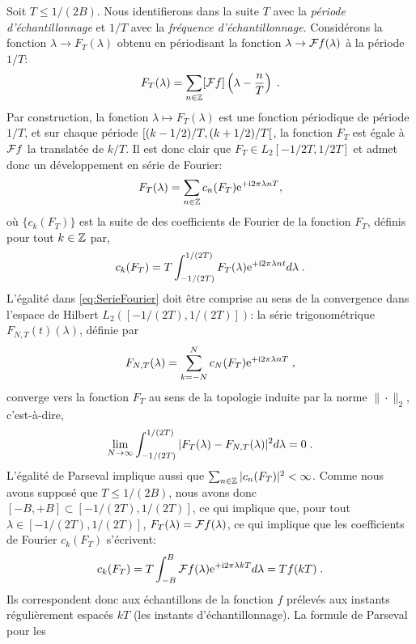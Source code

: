 Soit  $T \leq 1/(2B)$. Nous identifierons dans la suite $T$ avec la \emph{p{\'e}riode d'{\'e}chantillonnage} et $1/T$ avec la \emph{fr{\'e}quence d'{\'e}chantillonnage}.
Consid{\'e}rons la fonction $\lambda \to F_T(\lambda)$ obtenu en p{\'e}riodisant la fonction $\lambda \to \mathcal{F} f(\lambda)$ {\`a} la p{\'e}riode $1/T$:
$$
F_T (\lambda) = \sum_{n \in \mathbb{Z}} [\mathcal{F} f] \left( \lambda - \frac{n}{T} \right) \;.
$$
Par construction, la fonction $\lambda \mapsto F_T(\lambda)$ est une fonction p{\'e}riodique de p{\'e}riode $1/T$, et sur chaque
p{\'e}riode $\left[(k-1/2)/T,(k+1/2)/T\right[$, la fonction $F_T$ est {\'e}gale {\`a}  $\mathcal{F} f$ la translat{\'e}e de $k/T$.  Il est donc clair que
$F_T \in L_2{[-1/2T,1/2T]}$ et  admet donc un d{\'e}veloppement en s{\'e}rie de
Fourier:
\begin{equation}
\label{eq:SerieFourier}
F_T (\lambda) = \sum_{n \in \mathbb{Z}} c_n(F_T) \mathrm{e}^{+ \mathrm{i} 2 \pi \lambda n T},
\end{equation}
o{\`u} $\{c_k(F_T)\}$ est la suite de des coefficients de Fourier de la fonction $F_T$,
d{\'e}finis pour tout $k\in\mathbb{Z}$ par,
\begin{equation}
\label{eq:CoefficientFourier}
c_k(F_T) = T \int_{-1/(2T)}^{1/(2T)} F_T(\lambda) \mathrm{e}^{+ \mathrm{i} 2 \pi \lambda n t} d \lambda\;.
\end{equation}
L'{\'e}galit{\'e} dans \eqref{eq:SerieFourier} doit {\^e}tre comprise au sens de la convergence dans l'espace de Hilbert
$L_2([-1/(2T),1/(2T)])$: la s{\'e}rie trigonom{\'e}trique $F_{N,T}(t)(\lambda)$, d{\'e}finie par
\begin{equation}
F_{N,T}(\lambda)= \sum_{k=-N}^N c_N(F_T) \mathrm{e}^{+ \mathrm{i} 2 \pi \lambda n T} \;,
\end{equation}
converge vers la fonction $F_T$ au sens de la topologie induite par la norme $\|\cdot\|_2$, c'est-{\`a}-dire,
$$
\lim_{N \to \infty} \int_{-1/(2T)}^{1/(2T)} |F_T(\lambda) - F_{N,T}(\lambda)|^2 d \lambda =0 \;.
$$
L'{\'e}galit{\'e} de Parseval implique aussi que $\sum_{n \in \mathbb{Z}} |c_n(F_T)|^2 < \infty$. Comme nous avons suppos{\'e} que $T \leq
1/(2B)$, nous avons donc $[-B,+B] \subset [-1/(2T), 1/(2T)]$,
ce qui implique que, pour tout $\lambda \in [-1/(2T),1/(2T)]$, $F_T(\lambda) = \mathcal{F} f(\lambda)$, ce qui implique que les
coefficients de Fourier $c_k(F_T)$ s'{\'e}crivent:
\begin{equation}
\label{eq:CoefficientFourier}
c_k(F_T) = T \int_{-B}^{B} \mathcal{F} f(\lambda) \mathrm{e}^{+ \mathrm{i} 2 \pi \lambda k T} d \lambda= T f(kT)\;.
\end{equation}
Ils correspondent donc aux {\'e}chantillons de la fonction $f$ pr{\'e}lev{\'e}s aux instants r{\'e}guli{\`e}rement espac{\'e}s $kT$ (les instants d'{\'e}chantillonnage). La formule de Parseval pour les
